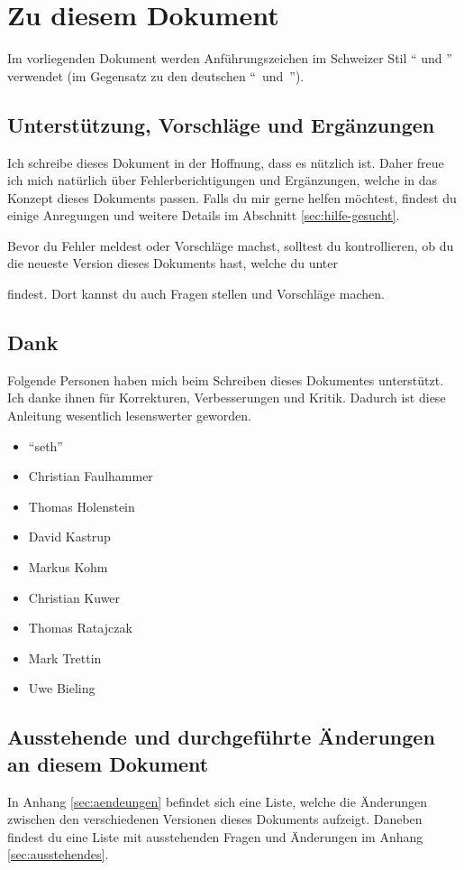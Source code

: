 \section{Zu diesem Dokument}

Im vorliegenden Dokument werden Anführungszeichen im Schweizer Stil \enquote{ und } verwendet (im Gegensatz zu den deutschen "`~und~"').

\subsection{Unterstützung, Vorschläge und Ergänzungen} %

Ich schreibe dieses Dokument in der Hoffnung, dass es nützlich ist. Daher freue ich mich natürlich über Fehlerberichtigungen und Ergänzungen, welche in das Konzept dieses Dokuments passen. Falls du mir gerne helfen möchtest, findest du einige Anregungen und weitere Details im Abschnitt \ref{sec:hilfe-gesucht}.

Bevor du Fehler meldest oder Vorschläge machst, solltest du kontrollieren, ob du die neueste Version dieses Dokuments hast, welche du unter


findest. Dort kannst du auch Fragen stellen und Vorschläge machen.

\subsection{Dank}

Folgende Personen haben mich beim Schreiben dieses Dokumentes unterstützt. Ich danke ihnen für Korrekturen, Verbesserungen und Kritik. Dadurch ist diese Anleitung wesentlich lesenswerter geworden. 

\begin{itemize}
	\item \enquote{seth}
	\item Christian Faulhammer
	\item Thomas Holenstein
	\item David Kastrup
	\item Markus Kohm
	\item Christian Kuwer
	\item Thomas Ratajczak
	\item Mark Trettin
	\item Uwe Bieling
\end{itemize}

\subsection{Ausstehende und durchgeführte Änderungen an diesem Dokument}

In Anhang \ref{sec:aendeungen} befindet sich eine Liste, welche die Änderungen zwischen den verschiedenen Versionen dieses Dokuments aufzeigt. Daneben findest du eine Liste mit ausstehenden Fragen und Änderungen im Anhang \ref{sec:ausstehendes}.

%
%
